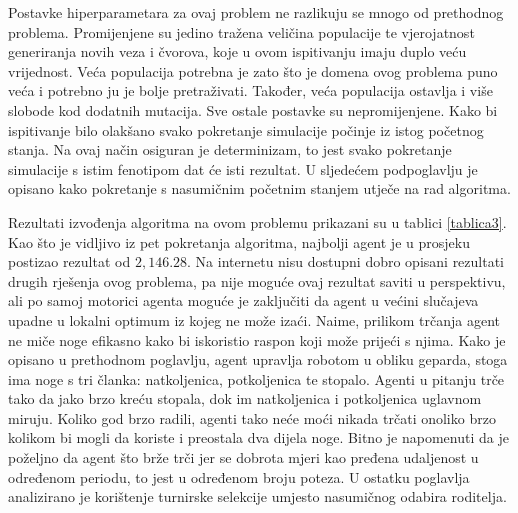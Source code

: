 \documentclass[times, utf8, diplomski, numeric]{fer}
\begin{document}
Postavke hiperparametara za ovaj problem ne razlikuju se mnogo od prethodnog problema. Promijenjene su jedino tražena veličina populacije te vjerojatnost generiranja novih veza i čvorova, koje u ovom ispitivanju imaju duplo veću vrijednost. Veća populacija potrebna je zato što je domena ovog problema puno veća i potrebno ju je bolje pretraživati. Također, veća populacija ostavlja i više slobode kod dodatnih mutacija. Sve ostale postavke su nepromijenjene. Kako bi ispitivanje bilo olakšano svako pokretanje simulacije počinje iz istog početnog stanja. Na ovaj način osiguran je determinizam, to jest svako pokretanje simulacije s istim fenotipom dat će isti rezultat. U sljedećem podpoglavlju je opisano kako pokretanje s nasumičnim početnim stanjem utječe na rad algoritma.

Rezultati izvođenja algoritma na ovom problemu prikazani su u tablici \ref{tablica3}. Kao što je vidljivo iz pet pokretanja algoritma, najbolji agent je u prosjeku postizao rezultat od $2,146.28$. Na internetu nisu dostupni dobro opisani rezultati drugih rješenja ovog problema, pa nije moguće ovaj rezultat saviti u perspektivu, ali po samoj motorici agenta moguće je zaključiti da agent u većini slučajeva upadne u lokalni optimum iz kojeg ne može izaći. Naime, prilikom trčanja agent ne miče noge efikasno kako bi iskoristio raspon koji može prijeći s njima. Kako je opisano u prethodnom poglavlju, agent upravlja robotom u obliku geparda, stoga ima noge s tri članka: natkoljenica, potkoljenica te stopalo. Agenti u pitanju trče tako da jako brzo kreću stopala, dok im natkoljenica i potkoljenica uglavnom miruju. Koliko god brzo radili, agenti tako neće moći nikada trčati onoliko brzo kolikom bi mogli da koriste i preostala dva dijela noge. Bitno je napomenuti da je poželjno da agent što brže trči jer se dobrota mjeri kao pređena udaljenost u određenom periodu, to jest u određenom broju poteza. U ostatku poglavlja analizirano je korištenje turnirske selekcije umjesto nasumičnog odabira roditelja.
\end{document}
